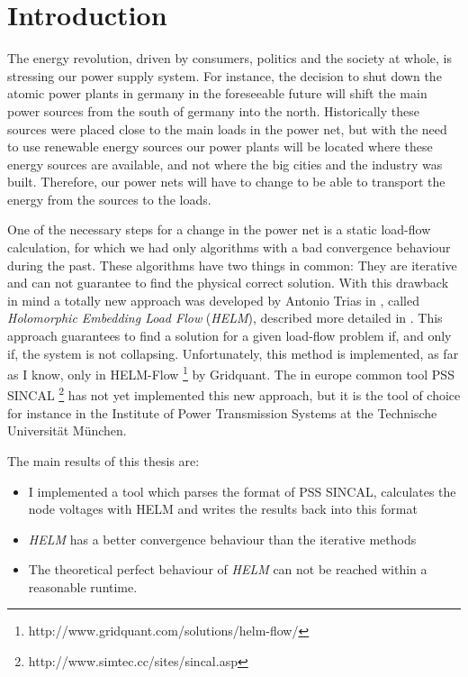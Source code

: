 \chapter{Introduction}
The energy revolution, driven by consumers, politics and the society at whole, is stressing our power supply system. For instance, the decision to shut down the atomic power plants in germany in the foreseeable future will shift the main power sources from the south of germany into the north. Historically these sources were placed close to the main loads in the power net, but with the need to use renewable energy sources our power plants will be located where these energy sources are available, and not where the big cities and the industry was built. Therefore, our power nets will have to change to be able to transport the energy from the sources to the loads.

One of the necessary steps for a change in the power net is a static load-flow calculation, for which we had only algorithms with a bad convergence behaviour during the past. These algorithms have two things in common: They are iterative and can not guarantee to find the physical correct solution. With this drawback in mind a totally new approach was developed by Antonio Trias in \citep{helmIEEE}, called \emph{Holomorphic Embedding Load Flow} (\emph{HELM}), described more detailed in . This approach guarantees to find a solution for a given load-flow problem if, and only if, the system is not collapsing. Unfortunately, this method is implemented, as far as I know, only in HELM-Flow \footnote{http://www.gridquant.com/solutions/helm-flow/} by Gridquant. The in europe common tool PSS SINCAL \footnote{http://www.simtec.cc/sites/sincal.asp} has not yet implemented this new approach, but it is the tool of choice for instance in the Institute of Power Transmission Systems at the Technische Universität München. 

The main results of this thesis are:
\begin{itemize}
	\item I implemented a tool which parses the format of PSS SINCAL, calculates the node voltages with HELM and writes the results back into this format
	\item \emph{HELM} has a better convergence behaviour than the iterative methods
	\item The theoretical perfect behaviour of \emph{HELM} can not be reached within a reasonable runtime.
\end{itemize}
